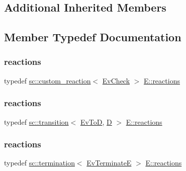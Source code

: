 \subsection*{Additional Inherited Members}


\subsection{Member Typedef Documentation}
\mbox{\label{struct_e_ad06410f6762dda5542a645bf3529ebe6}} 
\subsubsection{\texorpdfstring{reactions}{reactions}\hspace{0.1cm}{\footnotesize\ttfamily [1/4]}}
{\footnotesize\ttfamily typedef \mbox{\hyperlink{classboost_1_1statechart_1_1custom__reaction}{sc\+::custom\+\_\+reaction}}$<$ \mbox{\hyperlink{struct_ev_check}{Ev\+Check}} $>$ \mbox{\hyperlink{struct_e_a74945ed9425f80f1034e2ae1100d53ac}{E\+::reactions}}}

\mbox{\label{struct_e_ae439ec4811591cc609b7efbdf33a883d}} 
\subsubsection{\texorpdfstring{reactions}{reactions}\hspace{0.1cm}{\footnotesize\ttfamily [2/4]}}
{\footnotesize\ttfamily typedef \mbox{\hyperlink{classboost_1_1statechart_1_1transition}{sc\+::transition}}$<$ \mbox{\hyperlink{struct_ev_to_d}{Ev\+ToD}}, \mbox{\hyperlink{struct_d}{D}} $>$ \mbox{\hyperlink{struct_e_a74945ed9425f80f1034e2ae1100d53ac}{E\+::reactions}}}

\mbox{\label{struct_e_a6d3e91ddd0ac1560ad967313940ef464}} 
\subsubsection{\texorpdfstring{reactions}{reactions}\hspace{0.1cm}{\footnotesize\ttfamily [3/4]}}
{\footnotesize\ttfamily typedef \mbox{\hyperlink{classboost_1_1statechart_1_1termination}{sc\+::termination}}$<$ \mbox{\hyperlink{struct_ev_terminate_e}{Ev\+TerminateE}} $>$ \mbox{\hyperlink{struct_e_a74945ed9425f80f1034e2ae1100d53ac}{E\+::reactions}}}

